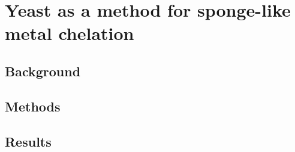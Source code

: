 \documentclass[../main/main]{subfiles}
\begin{document}
\chapter{Yeast as a method for sponge-like metal chelation}

\section{Background}

\section{Methods}

\section{Results}
\end{document}
